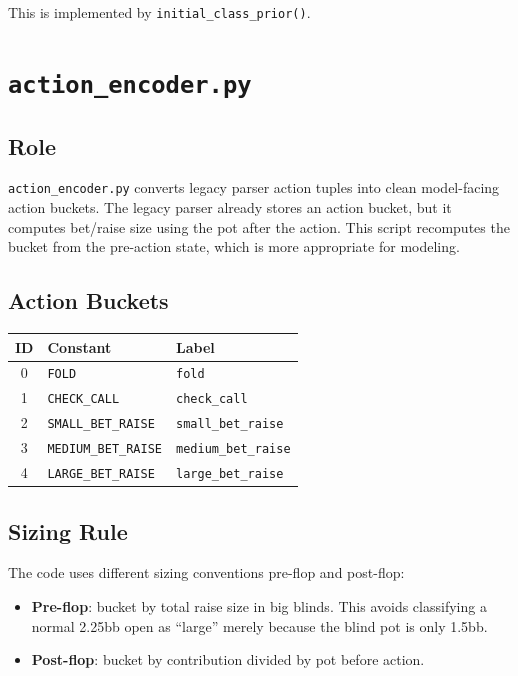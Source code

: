 \documentclass[11pt]{article}
\begin{document}
This is implemented by \texttt{initial\_class\_prior()}.

\section{\texttt{action\_encoder.py}}

\subsection{Role}

\texttt{action\_encoder.py} converts legacy parser action tuples into clean
model-facing action buckets. The legacy parser already stores an action bucket,
but it computes bet/raise size using the pot after the action. This script
recomputes the bucket from the pre-action state, which is more appropriate for
modeling.

\subsection{Action Buckets}

\begin{center}
\begin{tabular}{cll}
\toprule
\textbf{ID} & \textbf{Constant} & \textbf{Label} \\
\midrule
0 & \texttt{FOLD} & \texttt{fold} \\
1 & \texttt{CHECK\_CALL} & \texttt{check\_call} \\
2 & \texttt{SMALL\_BET\_RAISE} & \texttt{small\_bet\_raise} \\
3 & \texttt{MEDIUM\_BET\_RAISE} & \texttt{medium\_bet\_raise} \\
4 & \texttt{LARGE\_BET\_RAISE} & \texttt{large\_bet\_raise} \\
\bottomrule
\end{tabular}
\end{center}

\subsection{Sizing Rule}

The code uses different sizing conventions pre-flop and post-flop:

\begin{itemize}[leftmargin=*]
  \item \textbf{Pre-flop}: bucket by total raise size in big blinds. This avoids
  classifying a normal 2.25bb open as ``large'' merely because the blind pot is
  only 1.5bb.
  \item \textbf{Post-flop}: bucket by contribution divided by pot before action.
\end{itemize}
\end{document}
